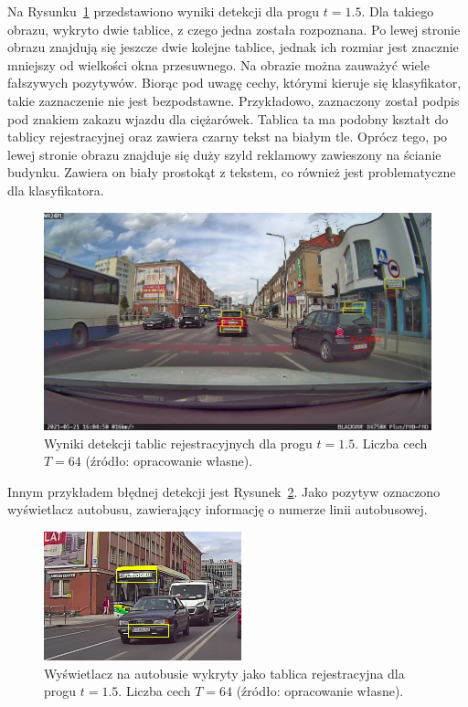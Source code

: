 Na Rysunku~\ref{fig:tablica_rozpoznana} przedstawiono wyniki detekcji dla progu $t=1.5$.
Dla takiego obrazu, wykryto dwie tablice, z czego jedna została rozpoznana.
Po lewej stronie obrazu znajdują się jeszcze dwie kolejne tablice, jednak ich rozmiar jest znacznie mniejszy od wielkości okna przesuwnego.
Na obrazie można zauważyć wiele fałszywych pozytywów.
Biorąc pod uwagę cechy, którymi kieruje się klasyfikator, takie zaznaczenie nie jest bezpodstawne.
Przykładowo, zaznaczony został podpis pod znakiem zakazu wjazdu dla ciężarówek.
Tablica ta ma podobny kształt do tablicy rejestracyjnej oraz zawiera czarny tekst na białym tle.
Oprócz tego, po lewej stronie obrazu znajduje się duży szyld reklamowy zawieszony na ścianie budynku.
Zawiera on biały prostokąt z tekstem, co również jest problematyczne dla klasyfikatora.
\begin{figure}[!ht]
    \centering
    \includegraphics[scale=0.4]{Pictures/tablica_rozpoznana}
    \caption{Wyniki detekcji tablic rejestracyjnych dla progu $t=1.5$. Liczba cech $T=64$ (źródło: opracowanie własne).}
    \label{fig:tablica_rozpoznana}
\end{figure}
\FloatBarrier
Innym przykładem błędnej detekcji jest Rysunek~\ref{fig:autobus}.
Jako pozytyw oznaczono wyświetlacz autobusu, zawierający informację o numerze linii autobusowej.
\begin{figure}[!ht]
    \centering
    \includegraphics[scale=1]{Pictures/autobus}
    \caption{Wyświetlacz na autobusie wykryty jako tablica rejestracyjna dla progu $t=1.5$. Liczba cech $T=64$ (źródło: opracowanie własne).}
    \label{fig:autobus}
\end{figure}
